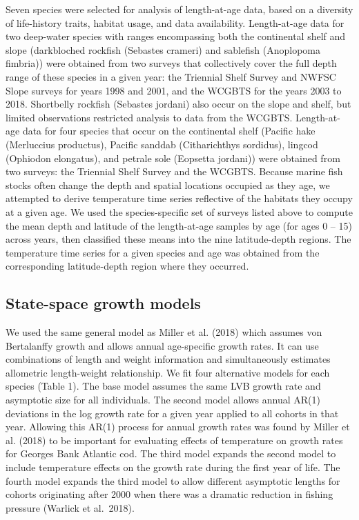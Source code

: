 \documentclass[]{article}
\begin{document}
Seven species were selected for analysis of length-at-age data, based on
a diversity of life-history traits, habitat usage, and data
availability. Length-at-age data for two deep-water species with ranges
encompassing both the continental shelf and slope (darkbloched rockfish
(Sebastes crameri) and sablefish (Anoplopoma fimbria)) were obtained
from two surveys that collectively cover the full depth range of these
species in a given year: the Triennial Shelf Survey and NWFSC Slope
surveys for years 1998 and 2001, and the WCGBTS for the years 2003 to
2018. Shortbelly rockfish (Sebastes jordani) also occur on the slope and
shelf, but limited observations restricted analysis to data from the
WCGBTS. Length-at-age data for four species that occur on the
continental shelf (Pacific hake (Merluccius productus), Pacific sanddab
(Citharichthys sordidus), lingcod (Ophiodon elongatus), and petrale sole
(Eopsetta jordani)) were obtained from two surveys: the Triennial Shelf
Survey and the WCGBTS. Because marine fish stocks often change the depth
and spatial locations occupied as they age, we attempted to derive
temperature time series reflective of the habitats they occupy at a
given age. We used the species-specific set of surveys listed above to
compute the mean depth and latitude of the length-at-age samples by age
(for ages 0 -- 15) across years, then classified these means into the
nine latitude-depth regions. The temperature time series for a given
species and age was obtained from the corresponding latitude-depth
region where they occurred.

\hypertarget{state-space-growth-models}{%
\subsection{State-space growth models}\label{state-space-growth-models}}

We used the same general model as Miller et al. (2018) which assumes von
Bertalanffy growth and allows annual age-specific growth rates. It can
use combinations of length and weight information and simultaneously
estimates allometric length-weight relationship. We fit four alternative
models for each species (Table 1). The base model assumes the same LVB
growth rate and asymptotic size for all individuals. The second model
allows annual AR(1) deviations in the log growth rate for a given year
applied to all cohorts in that year. Allowing this AR(1) process for
annual growth rates was found by Miller et al. (2018) to be important
for evaluating effects of temperature on growth rates for Georges Bank
Atlantic cod. The third model expands the second model to include
temperature effects on the growth rate during the first year of life.
The fourth model expands the third model to allow different asymptotic
lengths for cohorts originating after 2000 when there was a dramatic
reduction in fishing pressure (Warlick et al.~2018).
\end{document}

